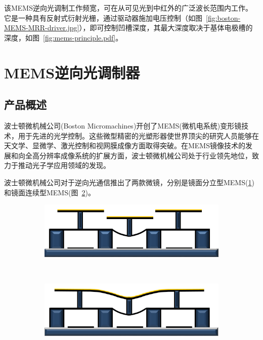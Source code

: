 该MEMS逆向光调制工作频宽，可在从可见光到中红外的广泛波长范围内工作。它是一种具有反射式衍射光栅，通过驱动器施加电压控制（如图~\ref{fig:boston-MEMS-MRR-driver.jpg}），即可控制凹槽深度，其最大深度取决于基体电极槽的深度，如图~\ref{fig:mems-principle.pdf}。

\section{MEMS逆向光调制器}
\subsection{产品概述}
波士顿微机械公司(Boston Micromachines)开创了MEMS(微机电系统)变形镜技术，用于先进的光学控制。这些微型精密的光塑形器使世界顶尖的研究人员能够在天文学、显微学、激光控制和视网膜成像方面取得突破。在MEMS镜像技术的发展和向全高分辨率成像系统的扩展方面，波士顿微机械公司处于行业领先地位，致力于推动光子学应用领域的发现。

波士顿微机械公司对于逆向光通信推出了两款微镜，分别是镜面分立型MEMS(\ref{fig:Segmented-DM.png})和镜面连续型MEMS(图~\ref{fig:Continuous-DM.png})。

\begin{figure}[!htbp]
	\centering
	\begin{subfigure}[c]{0.5\textwidth}
	\includegraphics[width=\textwidth]{./Img/Segmented-DM.png}
	\caption{}
	\label{fig:Segmented-DM.png}
	\end{subfigure}%
	~%
	\begin{subfigure}[c]{0.5\textwidth}
	\includegraphics[width=\textwidth]{./Img/Continuous-DM.png}
		\caption{}
		\label{fig:Continuous-DM.png}
	\end{subfigure}
\label{fig:MEMS-MRR}
\end{figure}


